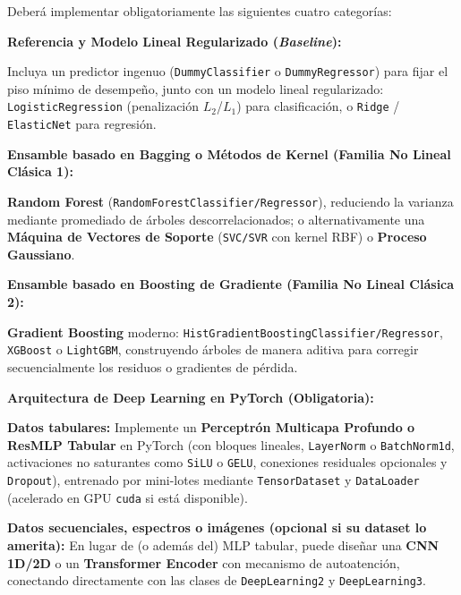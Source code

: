 \documentclass[11pt,a4paper]{article}
\let\origitemize\itemize
\let\endorigitemize\enditemize
\renewenvironment{itemize}{\origitemize\setlength{\itemsep}{2pt}\setlength{\parskip}{0pt}\setlength{\parsep}{0pt}}{\endorigitemize}
\let\origenumerate\enumerate
\let\endorigenumerate\endenumerate
\renewenvironment{enumerate}{\origenumerate\setlength{\itemsep}{2pt}\setlength{\parskip}{0pt}\setlength{\parsep}{0pt}}{\endorigenumerate}
\begin{document}
Deberá implementar obligatoriamente las siguientes cuatro categorías:

\begin{enumerate}
    \item \textbf{Referencia y Modelo Lineal Regularizado (\textit{Baseline}):}
    \begin{itemize}
        \item Incluya un predictor ingenuo (\texttt{DummyClassifier} o \texttt{DummyRegressor}) para fijar el piso mínimo de desempeño, junto con un modelo lineal regularizado: \texttt{LogisticRegression} (penalización $L_2$/$L_1$) para clasificación, o \texttt{Ridge} / \texttt{ElasticNet} para regresión.
    \end{itemize}
    \item \textbf{Ensamble basado en Bagging o Métodos de Kernel (Familia No Lineal Clásica 1):}
    \begin{itemize}
        \item \textbf{Random Forest} (\texttt{RandomForestClassifier/Regressor}), reduciendo la varianza mediante promediado de árboles descorrelacionados; o alternativamente una \textbf{Máquina de Vectores de Soporte} (\texttt{SVC/SVR} con kernel RBF) o \textbf{Proceso Gaussiano}.
    \end{itemize}
    \item \textbf{Ensamble basado en Boosting de Gradiente (Familia No Lineal Clásica 2):}
    \begin{itemize}
        \item \textbf{Gradient Boosting} moderno: \texttt{HistGradientBoostingClassifier/\allowbreak Regressor}, \texttt{XGBoost} o \texttt{LightGBM}, construyendo árboles de manera aditiva para corregir secuencialmente los residuos o gradientes de pérdida.
    \end{itemize}
    \item \textbf{Arquitectura de Deep Learning en PyTorch (Obligatoria):}
    \begin{itemize}
        \item \textbf{Datos tabulares:} Implemente un \textbf{Perceptrón Multicapa Profundo o ResMLP Tabular} en PyTorch (con bloques lineales, \texttt{LayerNorm} o \texttt{BatchNorm1d}, activaciones no saturantes como \texttt{SiLU} o \texttt{GELU}, conexiones residuales opcionales y \texttt{Dropout}), entrenado por mini-lotes mediante \texttt{TensorDataset} y \texttt{DataLoader} (acelerado en GPU \texttt{cuda} si está disponible).
        \item \textbf{Datos secuenciales, espectros o imágenes (opcional si su dataset lo amerita):} En lugar de (o además del) MLP tabular, puede diseñar una \textbf{CNN 1D/2D} o un \textbf{Transformer Encoder} con mecanismo de autoatención, conectando directamente con las clases de \texttt{DeepLearning2} y \texttt{DeepLearning3}.
    \end{itemize}
\end{enumerate}
\end{document}
